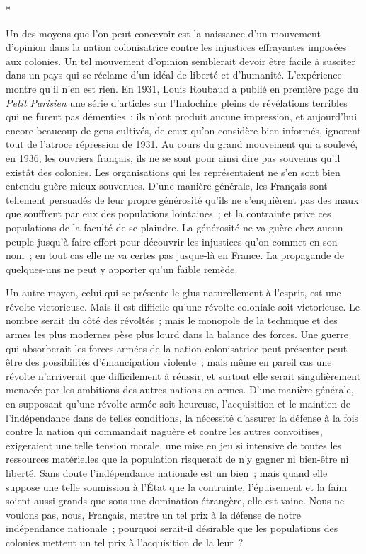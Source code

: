 \documentclass[french,twoside]{book} %
\begin{document}
\begin{center}
*\end{center}
\noindent Un des moyens que l'on peut concevoir est la naissance d'un mouvement d'opinion dans la nation colonisatrice contre les injustices effrayantes imposées aux colonies. Un tel mouvement d'opinion semblerait devoir être facile à susciter dans un pays qui se réclame d'un idéal de liberté et d'humanité. L'expérience montre qu'il n'en est rien. En 1931, Louis Roubaud a publié en première page du {\itshape Petit Parisien} une série d'articles sur l'Indochine pleins de révélations terribles qui ne furent pas démenties ; ils n'ont produit aucune impression, et aujourd'hui encore beaucoup de gens cultivés, de ceux qu'on considère bien informés, ignorent tout de l'atroce répression de 1931. Au cours du grand mouvement qui a soulevé, en 1936, les ouvriers français, ils ne se sont pour ainsi dire pas souvenus qu'il existât des colonies. Les organisations qui les représentaient ne s'en sont bien entendu guère mieux souvenues. D'une manière générale, les Français sont tellement persuadés de leur propre générosité qu'ils ne s'enquièrent pas des maux que souffrent par eux des populations lointaines ; et la contrainte prive ces populations de la faculté de se plaindre. La générosité ne va guère chez aucun peuple jusqu'à faire effort pour découvrir les injustices qu'on commet en son nom ; en tout cas elle ne va certes pas jusque-là en France. La propagande de quelques-uns ne peut y apporter qu'un faible remède.\par
Un autre moyen, celui qui se présente le glus naturellement à l'esprit, est une révolte victorieuse. Mais il est difficile qu'une révolte coloniale soit victorieuse. Le nombre serait du côté des révoltés ; mais le monopole de la technique et des armes les plus modernes pèse plus lourd dans la balance des forces. Une guerre qui absorberait les forces armées de la nation colonisatrice peut présenter peut-être des possibilités d'émancipation violente ; mais même en pareil cas une révolte n'arriverait que difficilement à réussir, et surtout elle serait singulièrement menacée par les ambitions des autres nations en armes. D'une manière générale, en supposant qu'une révolte armée soit heureuse, l'acquisition et le maintien de l'indépendance dans de telles conditions, la nécessité d'assurer la défense à la fois contre la nation qui commandait naguè­re et contre les autres convoitises, exigeraient une telle tension morale, une mise en jeu si intensive de toutes les ressources matérielles que la population risquerait de n'y gagner ni bien-être ni liberté. Sans doute l'indépendance nationale est un bien ; mais quand elle suppose une telle soumission à l'État que la contrainte, l'épuisement et la faim soient aussi grands que sous une domination étrangère, elle est vaine. Nous ne voulons pas, nous, Français, mettre un tel prix à la défense de notre indépendance nationale ; pourquoi serait-il désirable que les populations des colonies mettent un tel prix à l'acquisition de la leur ?\par
\end{document}
